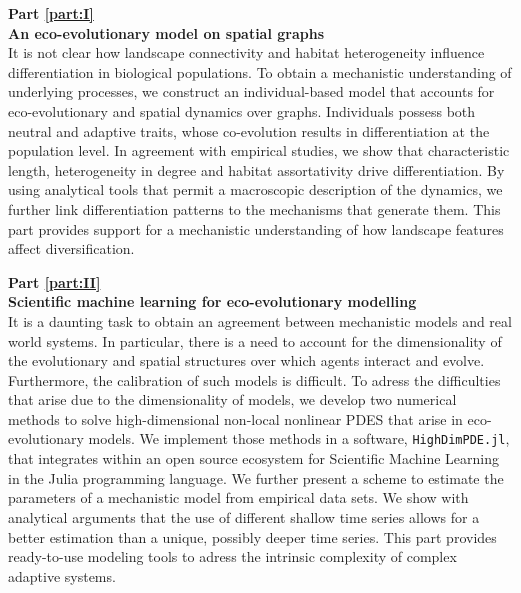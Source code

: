 \textbf{Part \ref{part:I}\\
An eco-evolutionary model on spatial graphs} \\[0.2em]
It is not clear how landscape connectivity and habitat heterogeneity influence differentiation in biological populations. 
%
To obtain a mechanistic understanding of underlying processes, we construct an individual-based model that accounts for eco-evolutionary and spatial dynamics over graphs. 
%
Individuals possess both neutral and adaptive traits, whose co-evolution results in differentiation at the population level.
%
In agreement with empirical studies, we show that characteristic length, heterogeneity in degree and habitat assortativity drive differentiation.
%
By using analytical tools that permit a macroscopic description of the dynamics, we further link differentiation patterns to the mechanisms that generate them.
%
This part provides support for a mechanistic understanding of how landscape features affect diversification.

\textbf{Part \ref{part:II}\\
Scientific machine learning for eco-evolutionary modelling} \\[0.2em]
%
It is a daunting task to obtain an agreement between mechanistic models and real world systems. In particular, there is a need to account for the dimensionality of the evolutionary and spatial structures over which agents interact and evolve. Furthermore, the calibration of such models is difficult.
%
To adress the difficulties that arise due to the dimensionality of models, we develop two numerical methods to solve high-dimensional non-local nonlinear PDES that arise in eco-evolutionary models. We implement those methods in a software, \texttt{HighDimPDE.jl}, that integrates within an open source ecosystem for Scientific Machine Learning in the Julia programming language.
%
We further present a scheme to estimate the parameters of a mechanistic model from empirical data sets. We show with analytical arguments that the use of different shallow time series allows for a better estimation than a unique, possibly deeper time series.
%
This part provides ready-to-use modeling tools to adress the intrinsic complexity of complex adaptive systems.

